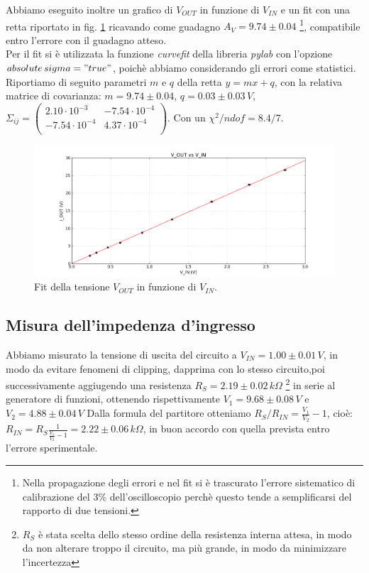\documentclass[10pt,a4paper]{article}
\begin{document}
Abbiamo eseguito inoltre un grafico di $V_{OUT}$ in funzione di $V_{IN}$ e un fit con una retta riportato in fig. \ref{rettaGuadagno} ricavando come guadagno $A_V=9.74\pm0.04$ \footnote{Nella propagazione degli errori e nel fit si è trascurato l'errore sistematico di calibrazione del  $3\%$ dell'oscilloscopio perchè questo tende a semplificarsi del rapporto di due tensioni.}, compatibile entro l'errore con il guadagno atteso.\\

Per il fit si è utilizzata la funzione \emph{curvefit} della libreria \emph{pylab} con l'opzione \emph{$absolute\,sigma = "true"$}, poichè abbiamo considerando gli errori come statistici. Riportiamo di seguito parametri $m$ e $q$ della retta $y=mx+q$, con la relativa matrice di covarianza: $m = 9.74 \pm 0.04$, $q = 0.03\pm 0.03 \, V$,  $ \Sigma_{ij} = \left( \begin{array}{cc}
2.10 \cdot 10^{-3} & -7.54 \cdot 10^{-4} \\ 
-7.54 \cdot 10^{-4} & 4.37 \cdot 10^{-4}\\
\end{array} \right)$. Con un $\chi^2/ndof = 8.4/7$.\\


\begin{figure}[!htb]
  \centering
  \includegraphics[scale=0.5]{plotGuadagno.png}
\caption{Fit della tensione $V_{OUT}$ in funzione di $V_{IN}$.}
\label{rettaGuadagno}
\end{figure}

\subsection{Misura dell'impedenza d'ingresso}
Abbiamo misurato la tensione di uscita del circuito a $V_{IN}=1.00 \pm 0.01 \, V$, in modo da evitare fenomeni di clipping, dapprima con lo stesso circuito,poi successivamente aggiugendo una resistenza $R_S=2.19 \pm 0.02 \, k \Omega$ \footnote{$R_S$ è stata scelta dello stesso ordine della resistenza interna attesa, in modo da non alterare troppo il circuito, ma più grande, in modo da minimizzare l'incertezza} in serie al generatore di funzioni, ottenendo rispettivamente $V_1=9.68 \pm 0.08 \, V$ e $V_2= 4.88 \pm 0.04 \, V$ Dalla formula del partitore otteniamo $R_S/R_{IN}=\frac{V_1}{V_2}-1$, cioè:
$R_{IN} = R_S \frac{1}{\frac{V_1}{V_2}-1} = 2.22 \pm 0.06 \, k \Omega$, in buon accordo con quella prevista entro l'errore sperimentale.
\end{document}
